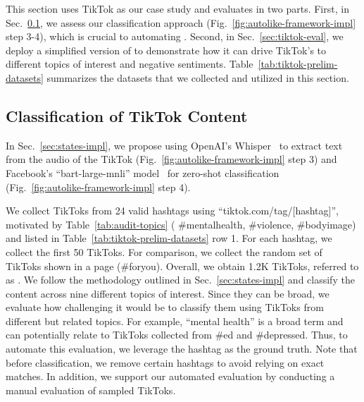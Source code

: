 This section uses TikTok as our case study and evaluates \autolike{} in two parts. First, in Sec.~\ref{sec:classify-eval}, we assess our classification approach (Fig.~\ref{fig:autolike-framework-impl} step 3-4), which is crucial to automating \autolike{}. 
Second, in Sec.~\ref{sec:tiktok-eval}, we deploy a simplified version of \autolike{} to demonstrate how it can drive TikTok's \rs{} to different topics of interest and negative sentiments. Table~\ref{tab:tiktok-prelim-datasets} summarizes the datasets that we collected and utilized in this section.



\subsection{Classification of TikTok Content}
\label{sec:classify-eval}

In Sec.~\ref{sec:states-impl}, we propose using OpenAI's Whisper~\cite{openaiwhisper} to extract text from the audio of the TikTok (Fig.~\ref{fig:autolike-framework-impl} step 3) and Facebook's ``bart-large-mnli'' model~\cite{bart-large-mnli} for zero-shot classification (Fig.~\ref{fig:autolike-framework-impl} step 4). %

 We collect TikToks from 24 valid hashtags using ``tiktok.com/tag/[hashtag]'', motivated by Table~\ref{tab:audit-topics} (\eg{} \#mentalhealth, \#violence, \#bodyimage) and listed in Table~\ref{tab:tiktok-prelim-datasets} row 1. 
For each hashtag, we collect the first 50 TikToks. For comparison, we collect the random set of TikToks shown in a \fyp{} page (\#foryou). Overall, we obtain \tilda{}1.2K TikToks, referred to as \autolikedatasetone{}. 
We follow the methodology outlined in Sec.~\ref{sec:states-impl} and classify the content across nine different topics of interest. Since they can be broad, we evaluate how challenging it would be to classify them using TikToks from different but related topics. For example, ``mental health'' is a broad term and can potentially relate to TikToks collected from \#ed and \#depressed. Thus, to automate this evaluation, we leverage the hashtag as the ground truth. Note that before classification, we remove certain hashtags to avoid relying on exact matches. In addition, we support our automated evaluation by conducting a manual evaluation of sampled TikToks. 

